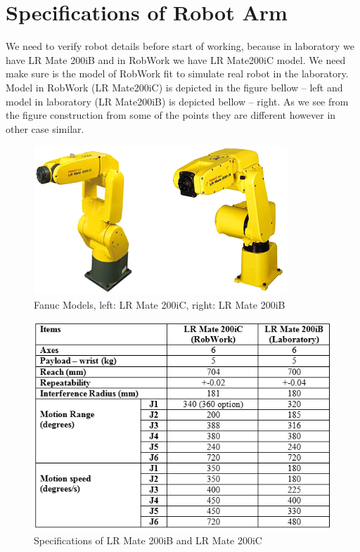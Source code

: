 \section{Specifications of Robot Arm}
\label{sec:spec}

We need to verify robot details before start of working, because in laboratory we have LR Mate 200iB and in RobWork we have LR Mate200iC model. We need make sure is the model of RobWork fit to simulate real robot in the laboratory. Model in RobWork (LR Mate200iC) is depicted in the figure bellow – left and model in laboratory (LR Mate200iB) is depicted bellow – right. As we see from the figure construction from some of the points they are different however in other case similar.

\begin{figure}[H]
  \centering
  \includegraphics[scale= 0.8]{source/fanucModelPhoto.png}
  \caption{Fanuc Models, left: LR Mate 200iC, right: LR Mate 200iB}
  \label{fig:FanucModels}
\end{figure}

\begin{figure}[H]
  \centering
  \includegraphics[scale= 0.8]{source/table1.png}
  \caption{Specifications of LR Mate 200iB and LR Mate 200iC}
  \label{fig:tableSpecifications}
\end{figure}


